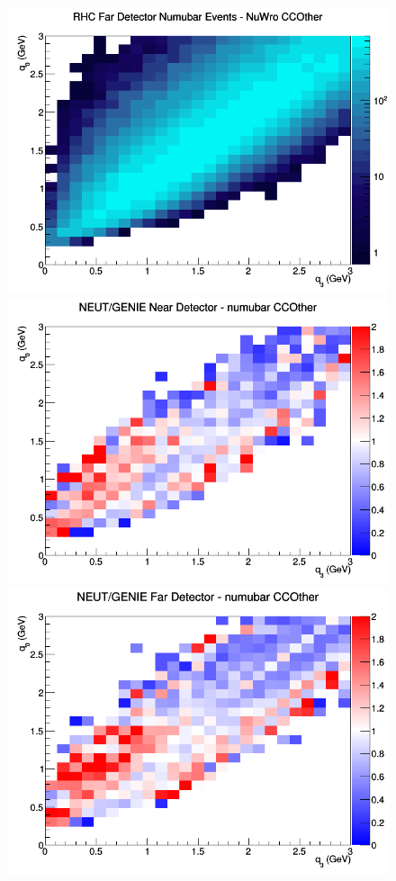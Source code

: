 \documentclass[12pt]{article}
\begin{document}
\begin{figure}[h]
\endminipage
{}
\includegraphics[width=\linewidth]{eff_q0_q3/GAr/CCOther_RHC_FD_numubar_q3_q0_NuWro.png}
\endminipage
\newline
{}
\includegraphics[width=\linewidth]{eff_q0_q3/GAr/ratios/CCOther_NEUT_GENIE_numubar_near_q3_q0.png}
\endminipage
{}
\includegraphics[width=\linewidth]{eff_q0_q3/GAr/ratios/CCOther_NEUT_GENIE_numubar_far_q3_q0.png}

\end{figure}
\end{document}
